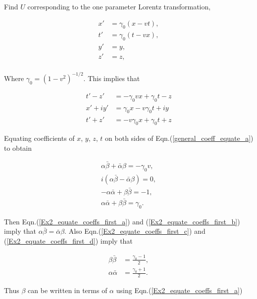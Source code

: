 \noindent Find $U$ corresponding to the one parameter Lorentz transformation,

\begin{align*} 
x' & = \gamma_0 (x-vt), \\
t' & = \gamma_0 (t-vx), \\
y' & = y, \\
z' & = z, \\
\end{align*} 

\noindent Where $\gamma_0 = (1-v^2)^{-1/2}$.  This implies that

\begin{align*}
t'-z' & = -\gamma_0 v x + \gamma_0 t - z \\
x'+iy' & = \gamma_0 x - v \gamma_0 t + iy  \\
t'+z' & = -v \gamma_0 x + \gamma_0 t +z
\end{align*}

\noindent Equating coefficients of $x$, $y$, $z$, $t$ on both sides of Eqn.(\ref{general_coeff_equate_a}) to obtain

\begin{subequations}
\begin{gather}\label{Ex2_equate_coeffs_first_a}
\alpha \bar{\beta} + \bar{\alpha} \beta = -\gamma_0 v, \\\label{Ex2_equate_coeffs_first_b}
i (\alpha \bar{\beta} - \bar{\alpha} \beta) = 0, \\\label{Ex2_equate_coeffs_first_c}
-\alpha \bar{\alpha} + \beta \bar{\beta} = -1, \\\label{Ex2_equate_coeffs_first_d}
\alpha \bar{\alpha} + \beta \bar{\beta} = \gamma_0. 
\end{gather}
\end{subequations}

\noindent Then Eqn.(\ref{Ex2_equate_coeffs_first_a}) and (\ref{Ex2_equate_coeffs_first_b}) imply that $\alpha \bar{\beta} = \bar{\alpha} \beta $. Also Eqn.(\ref{Ex2_equate_coeffs_first_c}) and (\ref{Ex2_equate_coeffs_first_d}) imply that

\begin{align}
\label{Ex2_refer_to_beta_beta}
\beta \bar{\beta} & = \frac{\gamma_0 - 1}{2},
\\\label{Ex2_refer_to_alpha_alpha}
\alpha \bar{\alpha} & = \frac{\gamma_0 + 1}{2}. 
\end{align}

\noindent Thus $\beta$ can be written in terms of $\alpha$ using Eqn.(\ref{Ex2_equate_coeffs_first_a})

